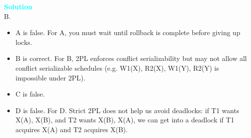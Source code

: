 \documentclass[10pt]{article}
\newenvironment{solution}
    { \begin{mdframed}[backgroundcolor=gray!10] \textcolor{cyan}{\textbf{Solution}} \\}
    {  \end{mdframed}}
\begin{document}
\begin{enumerate}
\begin{itemize}
		            \begin{solution}
			            B.
			            \begin{itemize}
				            \item A is false. For A, you must wait until rollback is
				                  complete before giving up locks.
				            \item B is correct. For B, 2PL enforces conflict serializability
				                  but may not allow all conflict serializable schedules (e.g. W1(X),
				                  R2(X), W1(Y), R2(Y) is impossible under 2PL).
				            \item C is false.
				            \item D is false. For D. Strict 2PL does not help us avoid
				                  deadlocks: if T1 wants X(A), X(B), and T2 wants X(B), X(A), we can
				                  get into a deadlock if T1 acquires X(A) and T2 acquires X(B).
			            \end{itemize}
		            \end{solution}

	      \end{itemize}


\end{enumerate}
\end{document}
